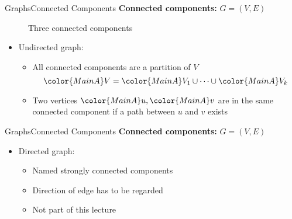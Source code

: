 \begin{frame}{Graphs}{Connected Components}
  \textbf{Connected components:}
      {\color{MainA}$G = (V , E)$}
  \begin{figure}
    \begin{adjustbox}{width=0.65\linewidth}
      
    \end{adjustbox}
    \caption{Three connected components}
  \end{figure}   
  \begin{itemize}
    \item<2->
      Undirected graph:
      \begin{itemize}
        \item<3->
          All connected components are a partition of {\color{MainA}$V$}
          \begin{displaymath}
            {\color{MainA}V}
              = {\color{MainA}V_1} \cup \dots \cup 
              {\color{MainA}V_k}
          \end{displaymath}
        \item<4->
          Two vertices ${\color{MainA}u}, {\color{MainA}v}$
          are in the same connected component if a path between
          {\color{MainA}$u$} and {\color{MainA}$v$} exists
      \end{itemize}
  \end{itemize}
\end{frame}


\begin{frame}{Graphs}{Connected Components}
  \textbf{Connected components:}
  {\color{MainA}$G = (V , E)$}
  \begin{itemize}
    \item<2->
      Directed graph:
      \begin{itemize}
        \item<3->
          Named {\color{MainA}strongly connected components}
        \item<4->
          Direction of edge has to be regarded
        \item<5->
          Not part of this lecture
      \end{itemize}
  \end{itemize}
\end{frame}

